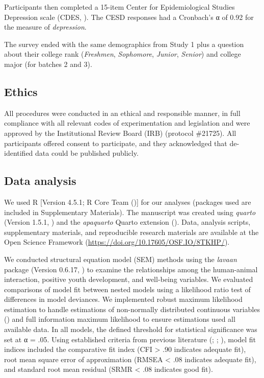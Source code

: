 \documentclass[
  jou,
  longtable,
  nolmodern,
  notxfonts,
  notimes,
  colorlinks=true,linkcolor=blue,citecolor=blue,urlcolor=blue]{apa7}
\begin{document}
Participants then completed a 15-item Center for Epidemiological Studies
Depression scale (CDES, ). The
CESD responses had a Cronbach's α of 0.92 for the measure of
\emph{depression}.

The survey ended with the same demographics from Study 1 plus a question
about their college rank (\emph{Freshmen}, \emph{Sophomore},
\emph{Junior}, \emph{Senior}) and college major (for batches 2 and 3).

\subsection{Ethics}\label{ethics}

All procedures were conducted in an ethical and responsible manner, in
full compliance with all relevant codes of experimentation and
legislation and were approved by the Institutional Review Board (IRB)
(protocol \#21725). All participants offered consent to participate, and
they acknowledged that de-identified data could be published publicly.

\subsection{Data analysis}\label{data-analysis}

We used R {[}Version 4.5.1; R Core Team (){]}
for our analyses (packages used are included in Supplementary
Materials). The manuscript was created using \emph{quarto} (Version
1.5.1, ) and the
\emph{apaquarto} Quarto extension (). Data, analysis scripts, supplementary materials, and
reproducible research materials are available at the Open Science
Framework (\url{https://doi.org/10.17605/OSF.IO/8TKHP/}).

We conducted structural equation model (SEM) methods using the
\emph{lavaan} package (Version 0.6.17, ) to examine the relationships among the human-animal interaction,
positive youth development, and well-being variables. We evaluated
comparisons of model fit between nested models using a likelihood ratio
test of differences in model deviances. We implemented robust maximum
likelihood estimation to handle estimations of non-normally distributed
continuous variables () and full information maximum likelihood to ensure estimations
used all available data. In all models, the defined threshold for
statistical significance was set at α = .05. Using established criteria
from previous literature (;
;
), model fit indices
included the comparative fit index (CFI \textgreater{} .90 indicates
adequate fit), root mean square error of approximation (RMSEA
\textless{} .08 indicates adequate fit), and standard root mean residual
(SRMR \textless{} .08 indicates good fit).
\end{document}
